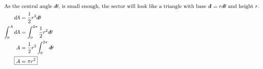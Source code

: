 \begin{enumerate}
\begin{solution}
        \begin{multicols}{2}
            \begin{align*}
                \intertext{As the central angle $d\!\theta$, is small enough, the sector will look like a triangle with base $d\!l=r d\!\theta$ and height $r$.}
                d\!A &= \frac{1}{2} r^2 d\!\theta\\
                \int_0^A d\!A &= \int_0^{2\pi} \frac{1}{2} r^2 d\!\theta\\
                A &= \frac{1}{2} r^2 \int_0^{2\pi} d\!\theta\\
                \Aboxed{A &= \pi r^2}
            \end{align*}
            \begin{center}
            \end{center}
        \end{multicols}
    \end{solution}


\end{enumerate}
